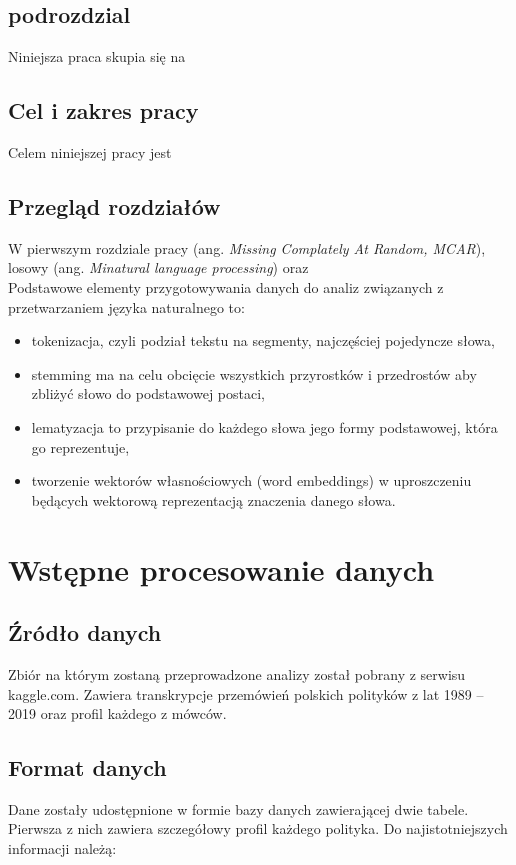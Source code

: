 \documentclass[a4paper,11pt,twoside]{report}
\theoremstyle{definition}
\begin{document}
\section{podrozdzial}\label{miss_vs_class}

Niniejsza praca skupia się na~

\section{Cel i zakres pracy}
Celem niniejszej pracy jest  \\

\section{Przegląd rozdziałów}
W pierwszym rozdziale pracy  (ang. \textit{Missing Complately At Random, MCAR}), losowy (ang. \textit{Minatural language processing}) oraz \\

Podstawowe elementy przygotowywania danych do analiz związanych z przetwarzaniem języka naturalnego to:
\begin{itemize}
 \item tokenizacja, czyli podział tekstu na segmenty, najczęściej pojedyncze słowa,
 \item stemming ma na celu obcięcie wszystkich przyrostków i przedrostów aby zbliżyć słowo do podstawowej postaci,
 \item lematyzacja to przypisanie do każdego słowa jego formy podstawowej, która go reprezentuje, 
 \item tworzenie wektorów własnościowych (word embeddings) w uproszczeniu będących wektorową reprezentacją znaczenia danego słowa.
\end{itemize}


\chapter{Wstępne procesowanie danych}

\section{Źródło danych}
Zbiór na którym zostaną przeprowadzone analizy został pobrany z serwisu kaggle.com. Zawiera transkrypcje przemówień polskich polityków  z lat 1989 – 2019 oraz profil każdego z mówców. 

\section{Format danych}
Dane zostały udostępnione w formie bazy danych zawierającej dwie tabele. Pierwsza z nich zawiera szczegółowy profil każdego polityka. Do najistotniejszych informacji należą:
\end{document}
